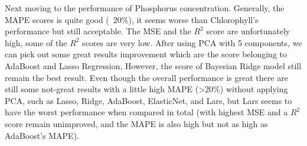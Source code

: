 Next moving to the performance of Phosphorus concentration. Generally, the MAPE scores is quite good (~20\%), it seems worse than Chlorophyll’s performance but still acceptable. The MSE and the \(R^2\) score are unfortunately high, some of the \(R^2\)  scores are very low. After using PCA with 5 components, we can pick out some great results improvement which are the score belonging to AdaBoost and Lasso Regression, However, the score of Bayesian Ridge model still remain the best result. Even though the overall performance is great there are still some not-great results with a little high MAPE (>20\%) without applying PCA, such as Lasso, Ridge, AdaBoost, ElasticNet, and Lars, but Lars seems to have the worst performance when compared in total (with highest MSE and a \(R^2\) score remain unimproved, and the MAPE is also high but not as high as AdaBoost’s MAPE). 



